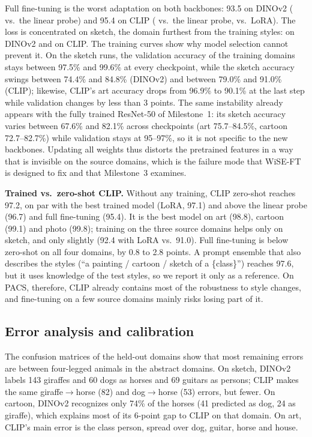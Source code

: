 \documentclass[conference]{IEEEtran}
\begin{document}
Full fine-tuning is the worst adaptation on both backbones: 93.5 on DINOv2 ( vs.\ the linear probe) and 95.4 on CLIP ( vs.\ the linear probe,  vs.\ LoRA). The loss is concentrated on sketch, the domain furthest from the training styles:  on DINOv2 and  on CLIP. The training curves show why model selection cannot prevent it. On the sketch runs, the validation accuracy of the training domains stays between 97.5\% and 99.6\% at every checkpoint, while the sketch accuracy swings between 74.4\% and 84.8\% (DINOv2) and between 79.0\% and 91.0\% (CLIP); likewise, CLIP's art accuracy drops from 96.9\% to 90.1\% at the last step while validation changes by less than 3 points. The same instability already appears with the fully trained ResNet-50 of Milestone~1: its sketch accuracy varies between 67.6\% and 82.1\% across checkpoints (art 75.7--84.5\%, cartoon 72.7--82.7\%) while validation stays at 95--97\%, so it is not specific to the new backbones. Updating all weights thus distorts the pretrained features in a way that is invisible on the source domains, which is the failure mode that WiSE-FT~\cite{wortsman2022wiseft} is designed to fix and that Milestone~3 examines.

\textbf{Trained vs.\ zero-shot CLIP.} Without any training, CLIP zero-shot reaches 97.2, on par with the best trained model (LoRA, 97.1) and above the linear probe (96.7) and full fine-tuning (95.4). It is the best model on art (98.8), cartoon (99.1) and photo (99.8); training on the three source domains helps only on sketch, and only slightly (92.4 with LoRA vs.\ 91.0). Full fine-tuning is below zero-shot on all four domains, by 0.8 to 2.8 points. A prompt ensemble that also describes the styles (``a painting / cartoon / sketch of a \{class\}'') reaches 97.6, but it uses knowledge of the test styles, so we report it only as a reference. On PACS, therefore, CLIP already contains most of the robustness to style changes, and fine-tuning on a few source domains mainly risks losing part of it.

\subsection{Error analysis and calibration}
The confusion matrices of the held-out domains show that most remaining errors are between four-legged animals in the abstract domains. On sketch, DINOv2 labels 143 giraffes and 60 dogs as horses and 69 guitars as persons; CLIP makes the same giraffe$\to$horse (82) and dog$\to$horse (53) errors, but fewer. On cartoon, DINOv2 recognizes only 74\% of the horses (41 predicted as dog, 24 as giraffe), which explains most of its 6-point gap to CLIP on that domain. On art, CLIP's main error is the class person, spread over dog, guitar, horse and house.
\end{document}
